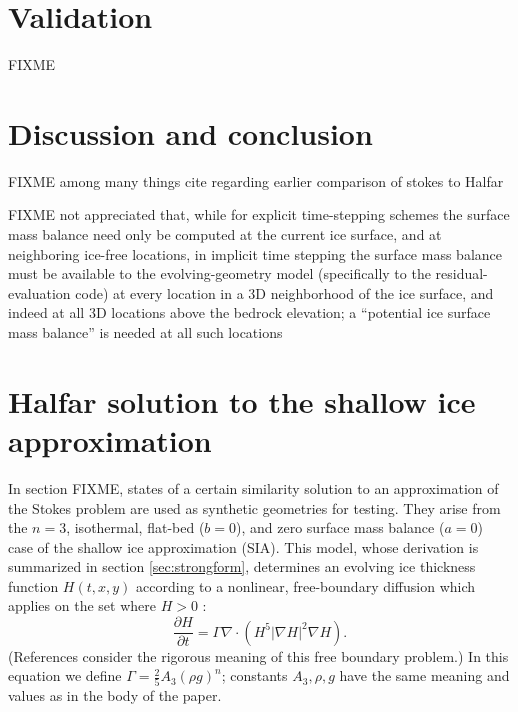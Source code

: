 \documentclass[letterpaper,final,12pt,reqno]{amsart}
\newcommand{\grad}{\nabla}
\newcommand{\Div}{\nabla\cdot}
\begin{document}
\section{Validation} \label{sec:validation}

FIXME


\section{Discussion and conclusion} \label{sec:discussion}

FIXME among many things cite \cite{LeysingerGudmundsson2004} regarding earlier comparison of stokes to Halfar

FIXME not appreciated that, while for explicit time-stepping schemes the surface mass balance need only be computed at the current ice surface, and at neighboring ice-free locations, in implicit time stepping the surface mass balance must be available to the evolving-geometry model (specifically to the residual-evaluation code) at every location in a 3D neighborhood of the ice surface, and indeed at all 3D locations above the bedrock elevation; a ``potential ice surface mass balance'' is needed at all such locations

\appendix
\section{Halfar solution to the shallow ice approximation}

In section FIXME, states of a certain similarity solution to an approximation of the Stokes problem are used as synthetic geometries for testing.  They arise from the $n=3$, isothermal, flat-bed ($b=0$), and zero surface mass balance ($a=0$) case of the shallow ice approximation (SIA).  This model, whose derivation is summarized in section \ref{sec:strongform}, determines an evolving ice thickness function $H(t,x,y)$ according to a nonlinear, free-boundary diffusion which applies on the set where $H>0$ \cite{Fowler1997}:
\begin{equation}
\frac{\partial H}{\partial t} = \Gamma \Div \left(H^5 |\grad H|^2 \grad H\right). \label{sia}
\end{equation}
(References \cite{Bueler2016,JouvetBueler2012} consider the rigorous meaning of this free boundary problem.)  In this equation we define $\Gamma = \frac{2}{5} A_3 (\rho g)^n$; constants $A_3,\rho,g$ have the same meaning and values as in the body of the paper.
\end{document}
